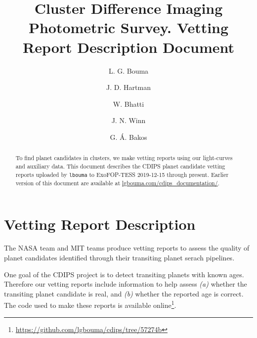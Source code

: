\documentclass[12pt,twocolumn,tighten]{aastex62}
\begin{document}
\title{
  Cluster Difference Imaging Photometric Survey.
  Vetting Report Description Document
}


\author[0000-0002-0514-5538]{L. G. Bouma}
%
\author[0000-0001-8732-6166]{J. D. Hartman}
%
\author[0000-0002-0628-0088]{W. Bhatti}
%
\author[0000-0002-4265-047X]{J. N. Winn}
%
\author[0000-0001-7204-6727]{G. \'A. Bakos}

\begin{abstract}
To find planet candidates in clusters,
we make vetting reports using our light-curves \citep{bouma_cdips_2019} and
auxiliary data.
This document describes the CDIPS planet candidate vetting reports
uploaded by \texttt{lbouma} to ExoFOP-TESS 2019-12-15 through present.
Earlier version of this document are available at
  \url{lgbouma.com/cdips_documentation/}.
\\

\end{abstract}


\section{Vetting Report Description}
\label{appendix:vetreport}

The NASA team and MIT teams \citep{jenkins_spoc_2010,huang_tess_2018}
produce vetting reports to assess the quality of planet candidates
identified through their transiting planet serach pipelines.

One goal of the CDIPS project is to detect transiting planets with
known ages.  Therefore our vetting reports include information to help
assess {\it (a)} whether the transiting planet candidate is real, and
{\it (b)} whether the reported age is correct.
The code used to make these reports is available online\footnote{
  \url{https://github.com/lgbouma/cdips/tree/57274b}}.
\end{document}
